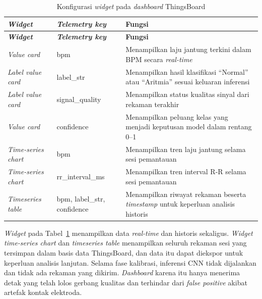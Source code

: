 \begin{center}
  \setlength{\tabcolsep}{4pt}
  \renewcommand{\arraystretch}{1.15}
  \small
  \begin{longtable}{p{4.0cm}p{3.1cm}p{6.0cm}}
    \caption{Konfigurasi \textit{widget} pada \textit{dashboard} ThingsBoard}
    \label{tab:widget-thingsboard} \\
    \toprule
    \textbf{\textit{Widget}} &
    \textbf{\textit{Telemetry key}} &
    \textbf{Fungsi} \\
    \midrule
    \endfirsthead
    \toprule
    \textbf{\textit{Widget}} &
    \textbf{\textit{Telemetry key}} &
    \textbf{Fungsi} \\
    \midrule
    \endhead
    \bottomrule
    \endfoot
    \textit{Value card} &
    bpm &
    Menampilkan laju jantung terkini dalam BPM secara \textit{real-time}\\
    \textit{Label value card} &
    label\_str &
    Menampilkan hasil klasifikasi ``Normal'' atau
    ``Aritmia'' sesuai keluaran inferensi \\
    \textit{Label value card} &
    signal\_quality &
    Menampilkan status kualitas sinyal dari rekaman terakhir \\
    \textit{Value card} &
    confidence &
    Menampilkan peluang kelas yang menjadi keputusan model dalam rentang 0--1 \\
    \textit{Time-series chart} &
    bpm &
    Menampilkan tren laju jantung selama sesi pemantauan \\
    \textit{Time-series chart} &
    rr\_interval\_ms &
    Menampilkan tren interval R-R selama sesi pemantauan \\
    \textit{Timeseries table} &
    bpm, label\_str, confidence &
    Menampilkan riwayat rekaman beserta \textit{timestamp} untuk
    keperluan analisis historis \\
  \end{longtable}
\end{center}

\textit{Widget} pada Tabel~\ref{tab:widget-thingsboard} menampilkan data
\textit{real-time} dan historis sekaligus. \textit{Widget} \textit{time-series chart}
dan \textit{timeseries table} menampilkan seluruh rekaman sesi yang tersimpan dalam basis data
ThingsBoard, dan data itu dapat diekspor untuk keperluan analisis
lanjutan. Selama fase kalibrasi, inferensi CNN tidak dijalankan dan
tidak ada rekaman yang dikirim. \textit{Dashboard} karena itu hanya menerima
detak yang telah lolos gerbang kualitas dan terhindar dari \textit{false
positive} akibat artefak kontak elektroda.

